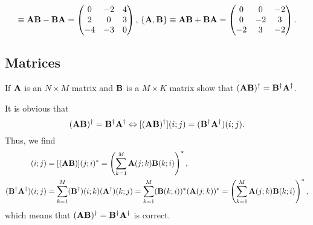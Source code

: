 \documentclass[a4paper]{book}
\newcommand{\A}{{\bf A}}
\newcommand{\B}{{\bf B}}
\begin{document}
	\begin{solution}
	\begin{equation}
		[\A,\B]\equiv \A\B-\B\A= \begin{pmatrix}
					0 & -2 & 4 \\
					2 & 0 & 3 \\
					-4 & -3 & 0
		\end{pmatrix}, \, \{\A,\B\}\equiv \A\B + \B\A =
		\begin{pmatrix}
					0	&	0	&	-2	\\
					0	&	-2	&	3	\\
					-2	&	3	&	-2
		\end{pmatrix}.
	\end{equation}
	\end{solution}
	
	\subsection{Matrices}
	
	\begin{exercise}
		If $\A$ is an $N \times M$ matrix and $\B$ is a $M \times K$ matrix show that $(\A\B)^\dagger = \B^\dagger \A^\dagger$.
	\end{exercise}
	
	\begin{solution}
	It is obvious that
	\begin{equation}
		(\A\B)^\dagger = \B^\dagger \A^\dagger \Leftrightarrow [(\A\B)^\dagger](i;j) = (\B^\dagger \A^\dagger)(i;j).
	\end{equation}
	Thus, we find
	\begin{align*}
		[(\A\B)^\dagger](i;j) &= [(\A\B)](j;i)^* = \left(\sum_{k=1}^M \A(j;k)\B(k;i)\right)^* , \\
		(\B^\dagger \A^\dagger)(i;j) &= \sum_{k=1}^M (\B^\dagger)(i;k) (\A^\dagger)(k;j) = \sum_{k=1}^M (\B(k;i))^* (\A(j;k))^* = \left(\sum_{k=1}^M \A(j;k)\B(k;i)\right)^*,
	\end{align*}
	which means that $(\A\B)^\dagger = \B^\dagger \A^\dagger$ is correct.
	\end{solution}
	
\end{document}
